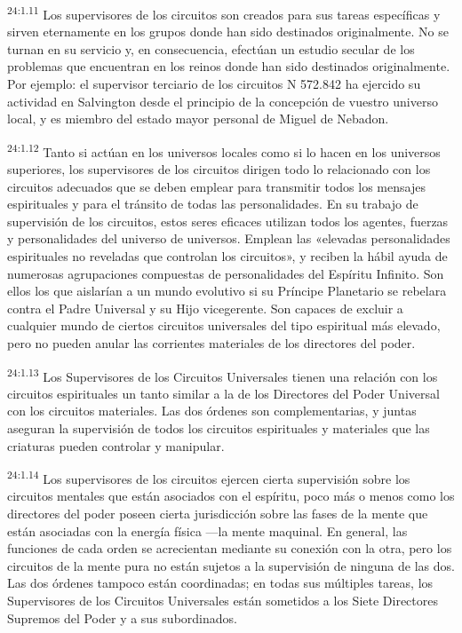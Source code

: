 \par
\textsuperscript{24:1.11} Los supervisores de los circuitos son creados para sus tareas específicas y sirven eternamente en los grupos donde han sido destinados originalmente. No se turnan en su servicio y, en consecuencia, efectúan un estudio secular de los problemas que encuentran en los reinos donde han sido destinados originalmente. Por ejemplo: el supervisor terciario de los circuitos N{\textdegree} 572.842 ha ejercido su actividad en Salvington desde el principio de la concepción de vuestro universo local, y es miembro del estado mayor personal de Miguel de Nebadon.

\par
\textsuperscript{24:1.12} Tanto si actúan en los universos locales como si lo hacen en los universos superiores, los supervisores de los circuitos dirigen todo lo relacionado con los circuitos adecuados que se deben emplear para transmitir todos los mensajes espirituales y para el tránsito de todas las personalidades. En su trabajo de supervisión de los circuitos, estos seres eficaces utilizan todos los agentes, fuerzas y personalidades del universo de universos. Emplean las «elevadas personalidades espirituales no reveladas que controlan los circuitos», y reciben la hábil ayuda de numerosas agrupaciones compuestas de personalidades del Espíritu Infinito. Son ellos los que aislarían a un mundo evolutivo si su Príncipe Planetario se rebelara contra el Padre Universal y su Hijo vicegerente. Son capaces de excluir a cualquier mundo de ciertos circuitos universales del tipo espiritual más elevado, pero no pueden anular las corrientes materiales de los directores del poder.

\par
\textsuperscript{24:1.13} Los Supervisores de los Circuitos Universales tienen una relación con los circuitos espirituales un tanto similar a la de los Directores del Poder Universal con los circuitos materiales. Las dos órdenes son complementarias, y juntas aseguran la supervisión de todos los circuitos espirituales y materiales que las criaturas pueden controlar y manipular.

\par
\textsuperscript{24:1.14} Los supervisores de los circuitos ejercen cierta supervisión sobre los circuitos mentales que están asociados con el espíritu, poco más o menos como los directores del poder poseen cierta jurisdicción sobre las fases de la mente que están asociadas con la energía física ---la mente maquinal. En general, las funciones de cada orden se acrecientan mediante su conexión con la otra, pero los circuitos de la mente pura no están sujetos a la supervisión de ninguna de las dos. Las dos órdenes tampoco están coordinadas; en todas sus múltiples tareas, los Supervisores de los Circuitos Universales están sometidos a los Siete Directores Supremos del Poder y a sus subordinados.

